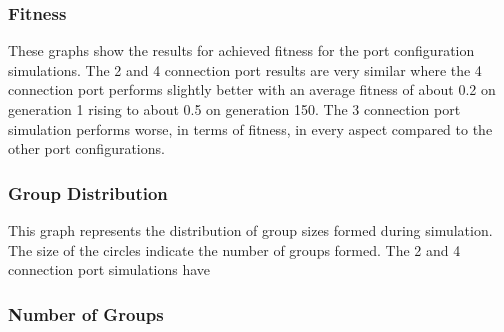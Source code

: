 \vspace*{\fill}
\begin{center}
	\subsubsection{Fitness}
	\vspace*{-0.6cm}
\end{center}


These graphs show the results for achieved fitness for the port configuration simulations.
The 2 and 4 connection port results are very similar where the 4 connection port performs slightly better with an average fitness of about 0.2 on generation 1 rising to about 0.5 on generation 150. 
The 3 connection port simulation performs worse, in terms of fitness, in every aspect compared to the other port configurations.

\vspace*{\fill}
\newpage
\vspace*{\fill}
\begin{center}
	\subsubsection{Group Distribution}
	\vspace*{-0.6cm}
\end{center}


This graph represents the distribution of group sizes formed during simulation.
The size of the circles indicate the number of groups formed.
The 2 and 4 connection port simulations have 

\vspace*{\fill}
\newpage
\vspace*{\fill}
\begin{center}
	\subsubsection{Number of Groups}
	\vspace*{-0.6cm}
\end{center}

